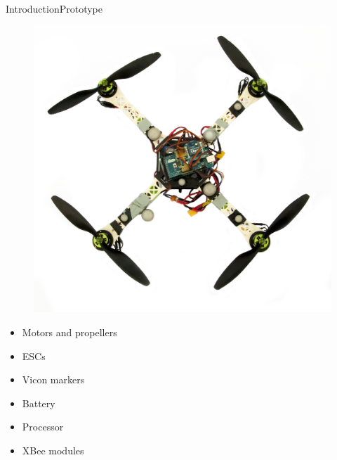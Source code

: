 \begin{frame}{Introduction}{Prototype}
    \begin{minipage}{\linewidth}
        \begin{minipage}{0.55\linewidth}
            \begin{figure}[H]
                \centering
                \includegraphics[width=\textwidth]{figures/quadcopter}
            \end{figure}
        \end{minipage}
        \hspace{0.03\linewidth}
        \begin{minipage}{0.43\linewidth}
            \begin{itemize}
                \item Motors and propellers
                \item ESCs
                \item Vicon markers
                \item Battery
                \item Processor
                \item XBee modules
            \end{itemize} 
        \end{minipage}
    \end{minipage}   
\end{frame}
